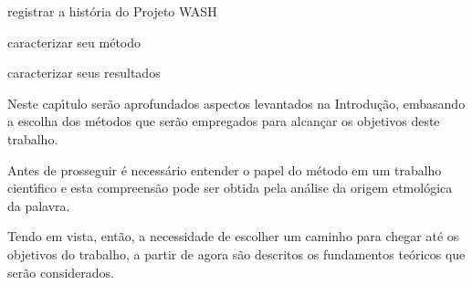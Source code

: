 \documentclass[
12pt,		%
openright,	%
twoside,  %
a4paper,			%
chapter=TITLE,		%
english,			%
french,				%
spanish,			%
brazil				%
]{USPSC-classe/USPSC_RedarTex}
\begin{document}
\begin{alineas}
\item registrar a hist\'oria do Projeto WASH
\item caracterizar seu m\'etodo
\item caracterizar seus resultados
\end{alineas}

Neste cap\'{\i}tulo ser\~ao aprofundados aspectos levantados na Introdu\c{c}\~ao, embasando a escolha dos m\'etodos que ser\~ao empregados para alcan\c{c}ar os objetivos deste trabalho.










Antes de prosseguir \'e necess\'ario entender o papel do m\'etodo em um trabalho cient\'{\i}fico e esta compreens\~ao pode ser obtida pela an\'alise da origem etmol\'ogica da palavra.











\noindent\begin{center}\mbox{\centering{}}\end{center}













Tendo em vista, ent\~ao, a necessidade de escolher um caminho para chegar at\'e os objetivos do trabalho, a partir de agora s\~ao descritos os fundamentos te\'oricos que ser\~ao considerados.
\end{document}
